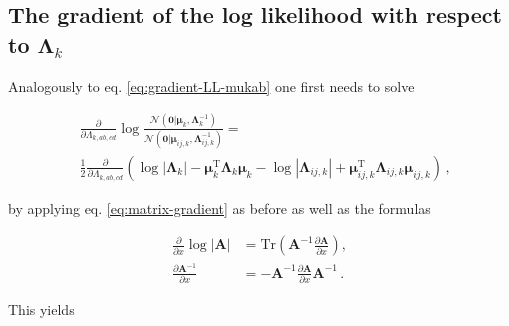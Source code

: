 \documentclass[12pt,a4paper,twoside]{book}
\newcommand{\Gauss}{\mathcal{N}}
\newcommand{\Lijk}{\mathbf{\Lambda}_{ij,k}}
\newcommand{\Lk}{\mathbf{\Lambda}_k}
\newcommand{\muijk}{\mathbf{\mu}_{ij,k}}
\newcommand{\muk}{\mathbf{\mu}_k}
\theoremstyle{definition}
\theoremstyle{definition}
\theoremstyle{remark}
\begin{document}
\subsection{\texorpdfstring{The gradient of the log likelihood with
respect to
\(\Lk\)}{The gradient of the log likelihood with respect to \textbackslash{}Lk}}\label{the-gradient-of-the-log-likelihood-with-respect-to-lk}

Analogously to eq. \eqref{eq:gradient-LL-mukab} one first needs to solve

\begin{align}
     & \frac{\partial}{\partial \Lambda_{k,ab,cd}} \log \frac{\Gauss( \mathbf{0} | \muk, \Lk^{-1})}{\Gauss( \mathbf{0} | \muijk, \Lijk^{-1})} 
    = \\
    &\frac{1}{2}  \frac{\partial}{\partial \Lambda_{k,ab,cd}}  \left( \log |\Lk| - \muk^\mathrm{T} \Lk \muk - \log |\Lijk| + \muijk^\mathrm{T} \Lijk \muijk \right) \,,
\label{eq:grad-log-N-N-lambdakabcd}
\end{align}

by applying eq. \eqref{eq:matrix-gradient} as before as well as the
formulas

\begin{align}
    \frac{\partial}{\partial x} \log |\mathbf{A} | &= \text{Tr}\left( \mathbf{A}^{-1} \frac{\partial \mathbf{A}}{\partial x}  \right) , \\
    \frac{\partial \mathbf{A}^{-1}}{\partial x} &= - \mathbf{A}^{-1} \frac{\partial \mathbf{A}}{\partial x} \mathbf{A}^{-1} \,.
\end{align}

This yields
\end{document}
